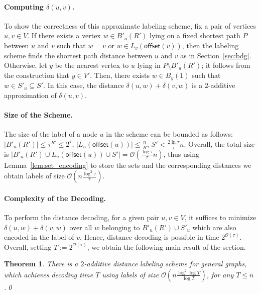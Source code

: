 \documentclass{article}[11pt,letter]
\newtheorem{theorem}[definition]{Theorem}
\newcommand{\bigo}{\mathcal{O}}
\newcommand{\symb}{R}
\newcommand{\offset}{\mathsf{offset}}
\newcommand{\cost}{\delta}
\begin{document}
\paragraph{Computing $\cost(u,v)$.}
To show the correctness of this approximate labeling scheme, fix a pair of vertices $u, v\in V$. If there exists a vertex $w\in B'_u(\symb')$ lying on a fixed shortest path $P$ between $u$ and $v$ such that $w=v$ or $w \in L_v(\offset(v))$, then the labeling scheme finds the shortest path distance between $u$ and $v$ as in Section~\ref{sec:bdg}. Otherwise, let $y$ be the nearest vertex to $u$ lying in $P \setminus B'_u(\symb')$; it follows from the construction that $y \in V'$. Then, there exists $w\in B_y(1)$ such that $w\in S'_u \subseteq S'$. In this case, the distance $\cost(u,w) + \cost (v,w)$ is a $2$-additive approximation of $\cost(u,v)$.

\paragraph{Size of the Scheme.}
The size of the label of a node $u$ in the scheme can be bounded as follows: $|B'_u(\symb')| \leq \tau^{\symb'}\leq 2^\tau$, $|L_u(\offset(u))| \leq \frac n\symb$, $S'  < \frac{2\ln \tau}{\tau} n$. Overall, the total size is $|B'_u(\symb')\cup L_u(\offset(u)) \cup S'| = \bigo(\frac{\log \tau}{\tau} n)$, thus using Lemma~\ref{lem:set_encoding} to store the sets and the corresponding distances we obtain labels of
size $\bigo(n \frac{\log^2 \tau}{\tau})$.

\paragraph{Complexity of the Decoding.}
To perform the distance decoding, for a given pair $u, v \in V$, it suffices to minimize $\cost(u,w) + \cost (v,w)$ over all $w$ belonging to $B'_u(\symb') \cup S'_u$ which are also encoded in the label of $v$. Hence, distance decoding is possible in time $2^{\bigo(\tau)}$. Overall, setting $T:=2^{\bigo(\tau)}$, we obtain the following main result of the section.

\begin{theorem}
There is a $2$-additive distance labeling scheme for general graphs, which achieves decoding time $T$ using labels of size $ \bigo(n \frac{\log^2 \log T}{\log T})$, for any $T \le n$.\qed
\end{theorem}
\end{document}
